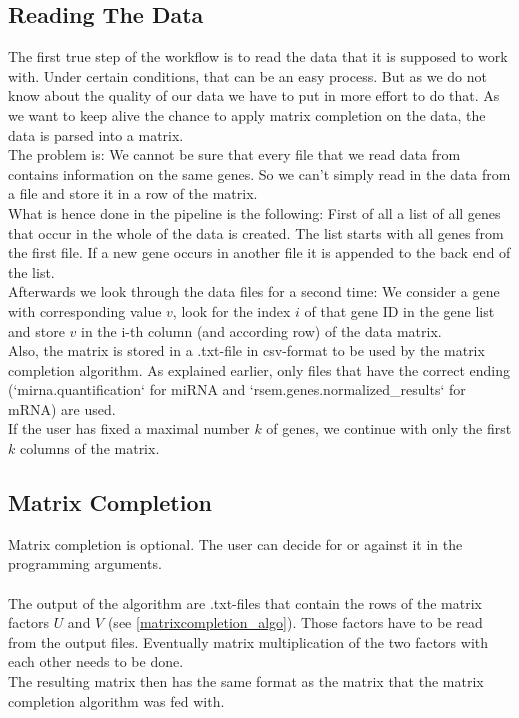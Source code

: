 \documentclass{bioinfo}
\begin{document}
\subsection{Reading The Data}
The first true step of the workflow is to read the data that it is supposed to work with. Under certain conditions, that can be an easy process. But as we do not know about the quality of our data we have to put in more effort to do that. As we want to keep alive the chance to apply matrix completion on the data, the data is parsed into a matrix.\\
The problem is: We cannot be sure that every file that we read data from contains information on the same genes. So we can't simply read in the data from a file and store it in a row of the matrix.\\
What is hence done in the pipeline is the following: First of all a list of all genes that occur in the whole of the data is created. The list starts with all genes from the first file. If a new gene occurs in another file it is appended to the back end of the list.\\
Afterwards we look through the data files for a second time: We consider a gene with corresponding value $v$, look for the index $i$ of that gene ID in the gene list and store $v$ in the i-th column (and according row) of the data matrix.\\
Also, the matrix is stored in a .txt-file in csv-format to be used by the matrix completion algorithm. As explained earlier, only files that have the correct ending (`mirna.quantification` for miRNA and `rsem.genes.normalized\_results` for mRNA) are used.\\
If the user has fixed a maximal number $k$ of genes, we continue with only the first $k$ columns of the matrix.

\subsection{Matrix Completion}
Matrix completion is optional. The user can decide for or against it in the programming arguments.\\\\
The output of the algorithm are .txt-files that contain the rows of the matrix factors $U$ and $V$ (see \ref{matrixcompletion_algo}). Those factors have to be read from the output files. Eventually matrix multiplication of the two factors with each other needs to be done.\\
The resulting matrix then has the same format as the matrix that the matrix completion algorithm was fed with.
\end{document}
